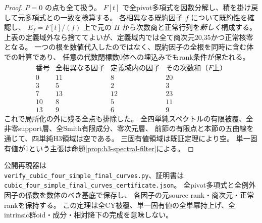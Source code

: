 \begin{proof}
$P=0$ の点も全て扱う。
$F[t]$ で全pivot多項式を因数分解し、積を掛け戻して元多項式との一致を検算する。
各相異なる既約因子 $f$ について既約性を確認し、
$E_f=F[t]/(f)$ 上で元の $H$ から次数商と正常行列を\emph{新しく}構成する。
上表の定義域外なら捨ててよいが、定義域内では全て商次元20,35かつ正常核零となる。
一つの根を数値代入したのではなく、既約因子の全根を同時に含む体での計算であり、
任意の代数閉標数0体への埋込みでもrank条件が保たれる。
\[
\begin{array}{c|r|r|r}
\text{番号}&\text{全相異なる因子}&\text{定義域内の因子}&\text{その次数和（}F\text{上）}\\\hline
0&11&8&20\\
3&5&2&3\\
7&13&12&23\\
10&8&5&11\\
13&9&6&9
\end{array}
\]
これで局所化の外に残る全点も排除した。
全四単純スペクトルの有限被覆、全非零support層、全Smith有限成分、零次元層、
前節の有限点と本節の五曲線を通じて、四単純H3領域は空である。
三固有値領域は既証定理により空。
単一固有値が1という主張は命題\ref{prop:h3-spectral-filter}による。
\end{proof}
公開再現器は\\
\texttt{verify\_cubic\_four\_simple\_final\_curves.py}、証明書は\\
\texttt{cubic\_four\_simple\_final\_curves\_certificate.json}。
全pivot多項式と全例外因子の係数を数体のべき基底で保存し、
各因子の元source rank・商次元・正常rankを保持する。
この定理は全CY被覆、単一固有値の全単冪持上げ、全intrinsic群oid・成分・相対降下の完成を意味しない。
